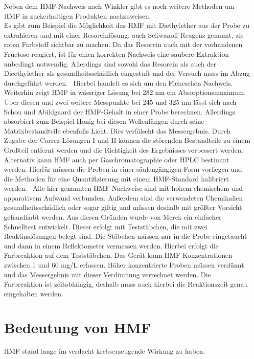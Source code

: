 Neben dem HMF-Nachweis nach Winkler gibt es noch weitere Methoden um HMF in zuckerhaltigen Produkten nachzuweisen.\\
Es gibt zum Beispiel die Möglichkeit das HMF mit Diethylether aus der Probe zu extrahieren und mit einer Resorcinlösung, auch Seliwanoff-Reagenz genannt, als roten Farbstoff sichtbar zu machen. Da das Resorcin auch mit der vorhandenen Fructose reagiert, ist für einen korrekten Nachweis eine saubere Extraktion unbedingt notwendig. Allerdings sind sowohl das Resorcin als auch der Dieethylether als gesundheitsschädlich eingestuft und der Versuch muss im Abzug durchgeführt werden.~\cite{Resorcinnachweis}
Hierbei handelt es sich um den Fieheschen Nachweis.~\cite{Winkler}\\
Weiterhin zeigt HMF in wässriger Lösung bei 282 nm ein Absorptionsmaximum. Über diesen und zwei weitere Messpunkte bei 245 und 325 nm lässt sich nach Schou und Abildgaard der HMF-Gehalt in einer Probe berechnen. Allerdings absorbiert zum Beispiel Honig bei diesen Wellenlängen durch seine Matrixbestandteile ebenfalls Licht. Dies verfälscht das Messergebnis. Durch Zugabe der Carrez-Lösungen I und II können die störenden Bestandteile zu einem Großteil entfernt werden und die Richtigkeit des Ergebnisses verbessert werden.~\cite{Winkler}
Alternativ kann HMF auch per Gaschromatographie oder HPLC bestimmt werden. Hierfür müssen die Proben in einer säulengängigen Form vorliegen und die Methoden für eine Quantifizierung mit einem HMF-Standard kalibriert werden.~\cite{Patent}
Alle hier genannten HMF-Nachweise sind mit hohem chemischem und apparativem Aufwand verbunden. Außerdem sind die verwendeten Chemikalien gesundheitsschädlich oder sogar giftig und müssen deshalb mit größter Vorsicht gehandhabt werden. Aus diesen Gründen wurde von Merck ein einfacher Schnelltest entwickelt. Dieser erfolgt mit Teststäbchen, die mit zwei Reaktinslösungen belegt sind. Die Stäbchen müssen nur in die Probe eingetaucht und dann in einem Reflektometer vermessen werden. Hierbei erfolgt die Farbreaktion auf dem Teststäbchen. Das Gerät kann HMF-Konzentrationen zwischen 1 und 60 mg/L erfassen. Höher konzentrierte Proben müssen verdünnt und das Messergebnis mit dieser Verdünnung verrechnet werden. Die Farbreaktion ist zeitabhängig, deshalb muss auch hierbei die Reaktionszeit genau eingehalten werden.~\cite{Merck}

\section{Bedeutung von HMF}
HMF stand lange im verdacht krebserzeugende Wirkung zu haben.

